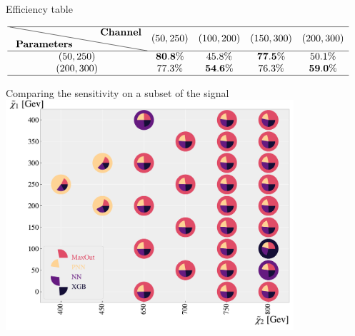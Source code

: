 \documentclass[UKenglish]{beamer}
\begin{document}
\begin{frame}{Efficiency table}
    \vfill
    \begin{table}
        \footnotesize
        \centering
        $
        \begin{array}{ccccc}
            \hline \text { \diagbox{\textbf{Parameters}}{\textbf{Channel}} }  & \text {$(50,250)$} & \text {$(100,200)$} & \text {$(150,300)$} & \text {$(200,300)$} \\
            \hline \text {$(50,250)$}   & \text { $\bf{80.8}\%$ } & \text { $45.8\%$ } & \text { $\bf{77.5}\%$ } & \text { $50.1\%$ } \\
            \text {$(200,300)$}   & \text { $77.3\%$ } & \text { $\bf{54.6}\%$ } & \text { $76.3\%$ } & \text { $\bf{59.0}\%$ }\\
            \hline
        \end{array}
        $
    \end{table}
\end{frame}

\begin{frame}{Comparing the sensitivity on a subset of the signal}
    \centering
    \includegraphics[width=0.8\textwidth]{figures/Comps/GenPlussXGBNetworkComp.pdf}
\end{frame}
\end{document}
